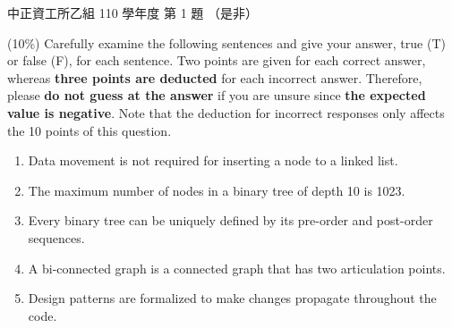 \begin{pastexam}[label={px:ccu-110-csb-01}]{中正資工所乙組 110 學年度 第 1 題}
（是非）

(10\%) Carefully examine the following sentences and give your answer, true (T) or false (F),
for each sentence. Two points are given for each correct answer, whereas \textbf{three points are
deducted} for each incorrect answer. Therefore, please \textbf{do not guess at the answer} if you
are unsure since \textbf{the expected value is negative}. Note that the deduction for incorrect
responses only affects the 10 points of this question.
\begin{enumerate}[label=(\alph*)]
\item Data movement is not required for inserting a node to a linked list.
\item The maximum number of nodes in a binary tree of depth 10 is 1023.
\item Every binary tree can be uniquely defined by its pre-order and post-order sequences.
\item A bi-connected graph is a connected graph that has two articulation points.
\item Design patterns are formalized to make changes propagate throughout the code.
\end{enumerate}
\end{pastexam}

